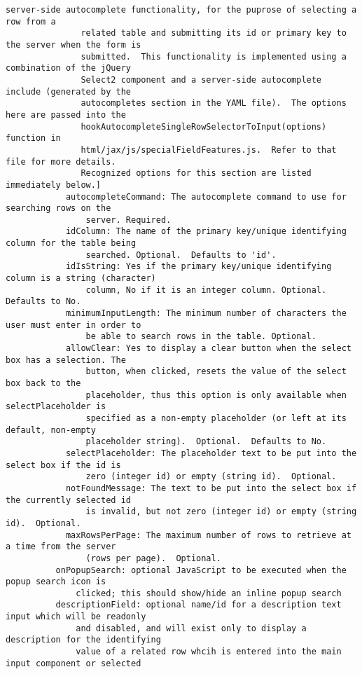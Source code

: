 \documentclass[letterpaper,10pt,english]{sphinxmanual}
\begin{document}
\begin{Verbatim}[commandchars=\\\{\}]
               server-side autocomplete functionality, for the puprose of selecting a row from a
               related table and submitting its id or primary key to the server when the form is
               submitted.  This functionality is implemented using a combination of the jQuery
               Select2 component and a server-side autocomplete include (generated by the
               autocompletes section in the YAML file).  The options here are passed into the
               hookAutocompleteSingleRowSelectorToInput(options) function in
               html/jax/js/specialFieldFeatures.js.  Refer to that file for more details.
               Recognized options for this section are listed immediately below.]
            autocompleteCommand: The autocomplete command to use for searching rows on the
                server. Required.
            idColumn: The name of the primary key/unique identifying column for the table being
                searched. Optional.  Defaults to 'id'.
            idIsString: Yes if the primary key/unique identifying column is a string (character)
                column, No if it is an integer column. Optional. Defaults to No.
            minimumInputLength: The minimum number of characters the user must enter in order to
                be able to search rows in the table. Optional.
            allowClear: Yes to display a clear button when the select box has a selection. The
                button, when clicked, resets the value of the select box back to the
                placeholder, thus this option is only available when selectPlaceholder is
                specified as a non-empty placeholder (or left at its default, non-empty
                placeholder string).  Optional.  Defaults to No.
            selectPlaceholder: The placeholder text to be put into the select box if the id is
                zero (integer id) or empty (string id).  Optional.
            notFoundMessage: The text to be put into the select box if the currently selected id
                is invalid, but not zero (integer id) or empty (string id).  Optional.
            maxRowsPerPage: The maximum number of rows to retrieve at a time from the server
                (rows per page).  Optional.
          onPopupSearch: optional JavaScript to be executed when the popup search icon is
              clicked; this should show/hide an inline popup search
          descriptionField: optional name/id for a description text input which will be readonly
              and disabled, and will exist only to display a description for the identifying
              value of a related row whcih is entered into the main input component or selected

\end{Verbatim}
\end{document}

